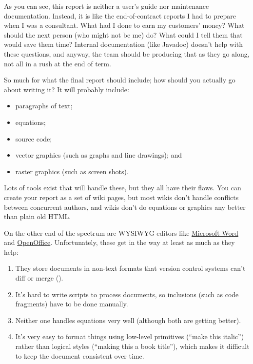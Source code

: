 \documentclass{report}
\begin{document}
As you can see, this report is neither a user's guide nor maintenance
documentation.  Instead, it is like the end-of-contract reports I had
to prepare when I was a consultant.  What had I done to earn my
customers' money?  What should the next person (who might not be me)
do?  What could I tell them that would save them time?  Internal
documentation (like Javadoc) doesn't help with these questions, and
anyway, the team should be producing that as they go along, not all in
a rush at the end of term.

So much for what the final report should include; how should you
actually go about writing it?  It will probably include:

\begin{itemize}

  \item paragraphs of text;

  \item equations;

  \item source code;

  \item vector graphics (such as graphs and line drawings); and

  \item raster graphics (such as screen shots).

\end{itemize}

Lots of tools exist that will handle these, but they all have their
flaws.  You can create your report as a set of wiki pages, but most
wikis don't handle conflicts between concurrent authors, and wikis
don't do equations or graphics any better than plain old HTML.

On the other end of the spectrum are WYSIWYG editors like
\url{Microsoft Word} and \url{OpenOffice}.  Unfortunately, these get
in the way at least as much as they help:

\begin{enumerate}

  \item They store documents in non-text formats that version control
  systems can't diff or merge ().

  \item It's hard to write scripts to process documents, so inclusions
  (such as code fragments) have to be done manually.

  \item Neither one handles equations very well (although both are
  getting better).

  \item It's very easy to format things using low-level primitives
  (``make this italic'') rather than logical styles (``making this a
  book title''), which makes it difficult to keep the document
  consistent over time.

\end{enumerate}
\end{document}
